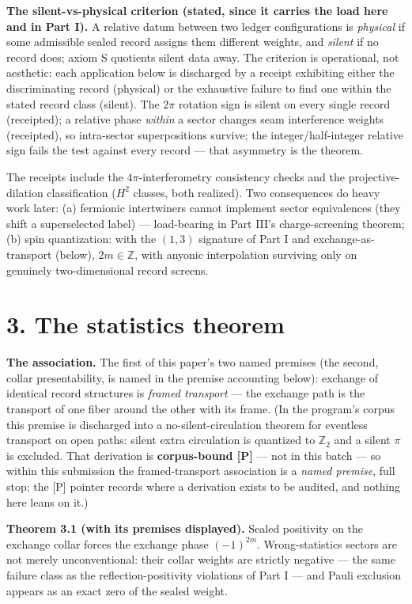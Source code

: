 \documentclass[11pt]{article}
\begin{document}
\textbf{The silent-vs-physical criterion (stated, since it carries the load here and in Part I).}  A relative datum between two ledger configurations is \emph{physical} if some admissible sealed record assigns them different weights, and \emph{silent} if no record does; axiom S quotients silent data away.  The criterion is operational, not aesthetic: each application below is discharged by a receipt exhibiting either the discriminating record (physical) or the exhaustive failure to find one within the stated record class (silent).  The $2\pi$ rotation sign is silent on every single record (receipted); a relative phase \emph{within} a sector changes seam interference weights (receipted), so intra-sector superpositions survive; the integer/half-integer relative sign fails the test against every record — that asymmetry is the theorem.

The receipts include the $4\pi$-interferometry consistency checks and the projective-dilation classification ($H^2$ classes, both realized).  Two consequences do heavy work later: (a) fermionic intertwiners cannot implement sector equivalences (they shift a superselected label) — load-bearing in Part III's charge-screening theorem; (b) spin quantization: with the $(1,3)$ signature of Part I and exchange-as-transport (below), $2m \in \mathbb Z$, with anyonic interpolation surviving only on genuinely two-dimensional record screens.

\section*{3. The statistics theorem}
\textbf{The association.}  The first of this paper's two named premises (the second, collar presentability, is named in the premise accounting below): exchange of identical record structures is \emph{framed transport} — the exchange path is the transport of one fiber around the other with its frame.  (In the program's corpus this premise is discharged into a no-silent-circulation theorem for eventless transport on open paths: silent extra circulation is quantized to $\mathbb Z_2$ and a silent $\pi$ is excluded.  That derivation is \textbf{corpus-bound [P]} — not in this batch — so within this submission the framed-transport association is a \emph{named premise}, full stop; the [P] pointer records where a derivation exists to be audited, and nothing here leans on it.)

\textbf{Theorem 3.1 (with its premises displayed).}  Sealed positivity on the exchange collar forces the exchange phase $(-1)^{2m}$. Wrong-statistics sectors are not merely unconventional: their collar weights are strictly negative — the same failure class as the reflection-positivity violations of Part I — and Pauli exclusion appears as an exact zero of the sealed weight.
\end{document}
